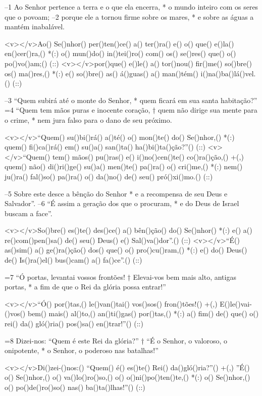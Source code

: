 –1 Ao Senhor pertence a terra e o que ela encerra, *
o mundo inteiro com os seres que o povoam;
–2 porque ele a tornou firme sobre os mares, *
e sobre as águas a mantém inabalável.

<v></v>Ao() Se()nhor() per()ten()ce() a() ter()ra() e() o() que() e()la() en()cer()ra,() *(:)
o() mun()do() in()tei()ro() com() os() se()res() que() o() po()vo()am;() (::)
<v></v>por()que() e()le() a() tor()nou() fir()me() so()bre() os() ma()res,() *(:)
e() so()bre() as() á()guas() a() man()tém() i()na()ba()lá()vel.() (::)

–3 “Quem subirá até o monte do Senhor, *
quem ficará em sua santa habitação?”
=4 “Quem tem mãos puras e inocente coração, †
quem não dirige sua mente para o crime, *
nem jura falso para o dano de seu próximo.

<v></v>``Quem() su()bi()rá() a()té() o() mon()te() do() Se()nhor,() *(:)
quem() fi()ca()rá() em() su()a() san()ta() ha()bi()ta()ção?''() (::)
<v></v>``Quem() tem() mãos() pu()ras() e() i()no()cen()te() co()ra()ção,() +(,)
quem() não() di()ri()ge() su()a() men()te() pa()ra() o() cri()me,() *(:)
nem() ju()ra() fal()so() pa()ra() o() da()no() de() seu() pró()xi()mo.() (::)

–5 Sobre este desce a bênção do Senhor *
e a recompensa de seu Deus e Salvador”.
–6 “É assim a geração dos que o procuram, *
e do Deus de Israel buscam a face”.

<v></v>So()bre() es()te() des()ce() a() bên()ção() do() Se()nhor() *(:)
e() a() re()com()pen()sa() de() seu() Deus() e() Sal()va()dor''.() (::)
<v></v>``É() as()sim() a() ge()ra()ção() dos() que() o() pro()cu()ram,() *(:)
e() do() Deus() de() Is()ra()el() bus()cam() a() fa()ce''.() (::)

=7 “Ó portas, levantai vossos frontões! †
Elevai-vos bem mais alto, antigas portas, *
a fim de que o Rei da glória possa entrar!”

<v></v>``Ó() por()tas,() le()van()tai() vos()sos() fron()tões!() +(,)
E()le()vai-()vos() bem() mais() al()to,() an()ti()gas() por()tas,() *(:)
a() fim() de() que() o() rei() da() gló()ria() pos()sa() en()trar!''() (::)

=8 Dizei-nos: “Quem é este Rei da glória?” †
“É o Senhor, o valoroso, o onipotente, *
o Senhor, o poderoso nas batalhas!”

<v></v>Di()zei-()nos:() ``Quem() é() es()te() Rei() da()gló()ria?''() +(,)
''É() o() Se()nhor,() o() va()lo()ro()so,() o() o()ni()po()ten()te,() *(:)
o() Se()nhor,() o() po()de()ro()so() nas() ba()ta()lhas!''() (::)

